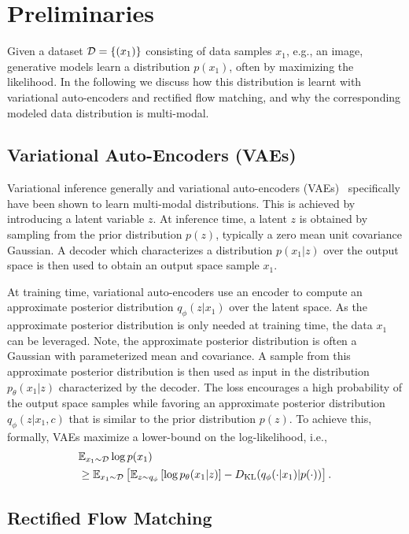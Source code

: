 \section{Preliminaries}
\label{sec:prelim}
Given a dataset ${\cal D} = \{(x_1)\}$ consisting of data samples $x_1$, e.g., an image, %
generative models learn a distribution $p(x_1)$, often by maximizing the likelihood. 
In the following we discuss how  this distribution is learnt with variational auto-encoders and rectified flow matching, and why the corresponding modeled data distribution is multi-modal. %

\subsection{Variational Auto-Encoders (VAEs)}
Variational inference generally and variational auto-encoders (VAEs)~\citep{KingmaICLR2014} specifically have been shown to learn multi-modal distributions. %
This is achieved by introducing a latent variable $z$. At inference time, a latent  $z$ is obtained by sampling from the prior distribution $p(z)$, typically a zero mean unit covariance Gaussian. %
A decoder which characterizes a distribution $p(x_1|z)$ over the output space is then used to obtain an output space sample $x_1$. %

At training time, variational auto-encoders use an encoder to compute an approximate posterior distribution $q_\phi(z|x_1)$ over the latent space. As the approximate posterior distribution is only needed at training time, the data $x_1$ %
can be leveraged. Note, the approximate posterior distribution is often a Gaussian with parameterized mean and covariance. A sample from this approximate posterior distribution is then used as input in the  distribution $p_\theta(x_1|z)$ characterized by the decoder. The loss encourages a high probability of the output space samples while favoring an approximate posterior distribution $q_\phi(z|x_1,c)$ that is similar to the prior distribution $p(z)$. To achieve this, formally, VAEs maximize a lower-bound on the log-likelihood, i.e., 
\begin{align*}
&\mathbb{E}_{x_1\sim{\cal D}}\log p(x_1) \\
&\geq \mathbb{E}_{x_1\sim{\cal D}}\left[\mathbb{E}_{z\sim q_\phi}\left[\log p_\theta(x_1|z)\right] - D_\text{KL}(q_\phi(\cdot|x_1)|p(\cdot))\right].
\end{align*}



\subsection{Rectified Flow Matching}

